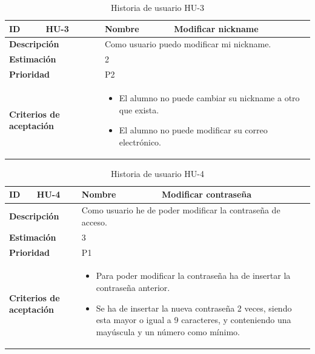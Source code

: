 \begin{table}[H]
    \centering
    \begin{tabular}{|p{2cm}|p{4cm}|p{2cm}|p{4cm}|}
        \hline
        \textbf{ID} & HU-3 & \textbf{Nombre} & Modificar nickname \\
        \hline
        \multicolumn{2}{|p{6cm}|}{\textbf{Descripción}} & \multicolumn{2}{p{6cm}|}{Como usuario puedo modificar mi nickname.} \\
        \hline
        \multicolumn{2}{|p{6cm}|}{\textbf{Estimación}} & \multicolumn{2}{p{6cm}|}{2} \\
        \hline
        \multicolumn{2}{|p{6cm}|}{\textbf{Prioridad}} & \multicolumn{2}{p{6cm}|}{P2} \\
        \hline
        \multicolumn{2}{|p{6cm}|}{\textbf{Criterios de aceptación}} & \multicolumn{2}{p{6cm}|}{
            \begin{itemize}
                \item El alumno no puede cambiar su nickname a otro que exista.
                \item El alumno no puede modificar su correo electrónico.
            \end{itemize}
        } \\
        \hline
    \end{tabular}
    \caption{Historia de usuario HU-3}
    \label{tab:hu_3}
\end{table}

\begin{table}[H]
    \centering
    \begin{tabular}{|p{2cm}|p{4cm}|p{2cm}|p{4cm}|}
        \hline
        \textbf{ID} & HU-4 & \textbf{Nombre} & Modificar contraseña \\
        \hline
        \multicolumn{2}{|p{6cm}|}{\textbf{Descripción}} & \multicolumn{2}{p{6cm}|}{Como usuario he de poder modificar la contraseña de acceso.} \\
        \hline
        \multicolumn{2}{|p{6cm}|}{\textbf{Estimación}} & \multicolumn{2}{p{6cm}|}{3} \\
        \hline
        \multicolumn{2}{|p{6cm}|}{\textbf{Prioridad}} & \multicolumn{2}{p{6cm}|}{P1} \\
        \hline
        \multicolumn{2}{|p{6cm}|}{\textbf{Criterios de aceptación}} & \multicolumn{2}{p{6cm}|}{
            \begin{itemize}
                \item Para poder modificar la contraseña ha de insertar la contraseña anterior.
                \item Se ha de insertar la nueva contraseña 2 veces, siendo esta  mayor o igual a 9 caracteres, y conteniendo una mayúscula y un número como mínimo.
            \end{itemize}
        } \\
        \hline
    \end{tabular}
    \caption{Historia de usuario HU-4}
    \label{tab:hu_4}
\end{table}

